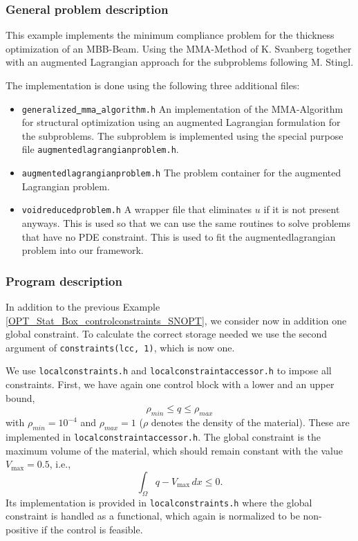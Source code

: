 \subsubsection{General problem description}
This example implements the minimum compliance problem for the thickness optimization 
of an MBB-Beam. Using the MMA-Method of K. Svanberg together with an augmented Lagrangian 
approach for the subproblems following M. Stingl.

The implementation is done using the following three additional files:

\begin{itemize}
\item \texttt{generalized\underline{ }mma\underline{ }algorithm.h}
  An implementation of the MMA-Algorithm for structural optimization using an augmented
  Lagrangian formulation for the subproblems. The subproblem is implemented using the 
  special purpose\\ file \texttt{augmentedlagrangianproblem.h}.
\item \texttt{augmentedlagrangianproblem.h} The problem container 
  for the augmented Lagrangian problem.
\item \texttt{voidreducedproblem.h} A wrapper file that eliminates $u$ 
  if it is not present anyways. This is used so that we can use the same routines to 
  solve problems that have no PDE constraint. This is used to fit the augmentedlagrangian 
  problem into our framework.
\end{itemize}


\subsubsection{Program description}
In addition to the previous Example \ref{OPT_Stat_Box_controlconstraints_SNOPT}, 
we consider now in addition one global constraint. To calculate the correct 
storage needed we use the 
second argument of \texttt{constraints(lcc, 1)}, which is now one. 

We use 
\texttt{localconstraints.h} and \texttt{localconstraintaccessor.h} to impose 
all constraints. First, we have again one control block with a lower and 
an upper bound, 
\[
\rho_{min} \leq q \leq \rho_{max}
\]
with $\rho_{min} = 10^{-4}$ and $\rho_{max} = 1$ ($\rho$ denotes the density
of the material). These are implemented in \texttt{localconstraintaccessor.h}.
The global constraint is the maximum volume of the material,
which should remain constant with the value $V_{\max} = 0.5$, i.e.,
\[
 \int_\Omega q - V_{\max} \,dx \le 0.
\]
Its implementation is 
provided in \texttt{localconstraints.h} where the global constraint is handled as 
a functional, which again is normalized to be non-positive if the control is feasible.

